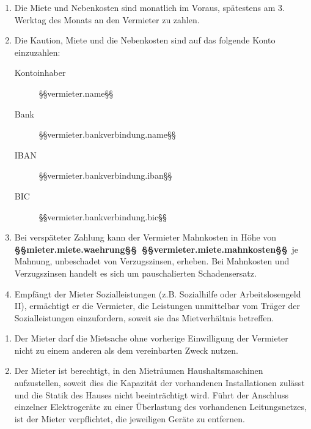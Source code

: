 \documentclass{scrreprt}[12pt,a4paper,twoside,duplex]
\begin{document}
\begin{contract}
  \begin{enumerate}
    \item Die Miete und Nebenkosten sind monatlich im Voraus, spätestens am 3.
    Werktag des Monats an den Vermieter zu zahlen.
    \item Die Kaution, Miete und die Nebenkosten sind auf das folgende Konto einzuzahlen:
    \begin{description}
      \item[Kontoinhaber] §§vermieter.name§§
      \item[Bank] §§vermieter.bankverbindung.name§§
      \item[IBAN] §§vermieter.bankverbindung.iban§§
      \item[BIC] §§vermieter.bankverbindung.bic§§
    \end{description}
    \item Bei verspäteter Zahlung kann der Vermieter Mahnkosten in Höhe von
    \textbf{§§mieter.miete.waehrung§§\ §§vermieter.miete.mahnkosten§§}\ je Mahnung, unbeschadet von
    Verzugszinsen, erheben. Bei Mahnkosten und Verzugszinsen handelt es sich um
    pauschalierten Schadensersatz.
    \item Empfängt der Mieter Sozialleistungen (z.B. Sozialhilfe oder Arbeitslosengeld II), ermächtigt er die Vermieter, die Leistungen unmittelbar vom Träger der Sozialleistungen einzufordern, soweit sie das Mietverhältnis betreffen.
  \end{enumerate}
\end{contract}

\begin{contract}
	\begin{enumerate}
		\item Der Mieter darf die Mietsache ohne vorherige Einwilligung der Vermieter nicht zu einem anderen als dem vereinbarten Zweck nutzen.
		\item Der Mieter ist berechtigt, in den Mieträumen Haushaltsmaschinen aufzustellen, soweit dies die Kapazität der vorhandenen Installationen zulässt und die Statik des Hauses nicht beeinträchtigt wird. Führt der Anschluss einzelner Elektrogeräte zu einer Überlastung des vorhandenen Leitungsnetzes, ist der Mieter verpflichtet, die jeweiligen Geräte zu entfernen.
	\end{enumerate}
\end{contract}
\end{document}
